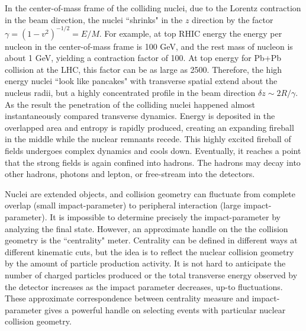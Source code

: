 In the center-of-mass frame of the colliding nuclei, due to the Lorentz contraction in the beam direction, the nuclei ``shrinks" in the $z$ direction by the factor $\gamma = (1-v^2)^{-1/2} = E/M$. 
For example, at top RHIC energy the energy per nucleon in the center-of-mass frame is 100 GeV, and the rest mass of nucleon is about 1 GeV, yielding a contraction factor of 100. 
At top energy for Pb+Pb collision at the LHC, this factor can be as large as 2500.
Therefore, the high energy nuclei ``look like pancakes" with transverse spatial extend about the nucleus radii, but a highly concentrated profile in the beam direction $\delta z \sim 2R/\gamma$.
As the result the penetration of the colliding nuclei happened almost instantaneously compared transverse dynamics.
Energy is deposited in the overlapped area and entropy is rapidly produced, creating an expanding fireball in the middle while the nuclear remnants recede.
This highly excited fireball of fields undergoes complex dynamics and cools down.
Eventually, it reaches a point that the strong fields is again confined into hadrons. The hadrons may decay into other hadrons, photons and lepton, or free-stream into the detectors.

Nuclei are extended objects, and collision geometry can fluctuate from complete overlap (small impact-parameter) to peripheral interaction (large impact-parameter).
It is impossible to determine precisely the impact-parameter by analyzing the final state. 
However, an approximate handle on the the collision geometry is the ``centrality" meter. 
Centrality can be defined in different ways at different kinematic cuts, but the idea is to reflect the nuclear collision geometry by the amount of particle production activity.
It is not hard to anticipate the number of charged particles produced or the total transverse energy observed by the detector increases as the impact parameter decreases, up-to fluctuations.
These approximate correspondence between centrality measure and impact-parameter gives a powerful handle on selecting events with particular nuclear collision geometry.


